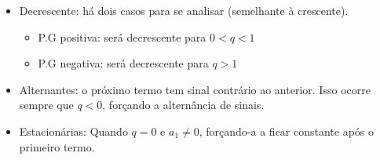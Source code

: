 \documentclass[11pt]{article}
\begin{document}
\begin{itemize}
  \item Decrescente: há dois casos para se analisar (semelhante à crescente).
        \begin{itemize}
                \item P.G positiva: será decrescente para $0 < q < 1$
                \item P.G negativa: será decrescente para $q > 1$
        \end{itemize}
\end{itemize}

\begin{itemize}
  \item Alternantes: o próximo termo tem sinal contrário ao anterior. Isso ocorre sempre que $q < 0$, forçando a alternância de sinais.

  \item Estacionárias: Quando $q = 0$ e $a_{1} \neq 0$, forçando-a a ficar constante após o primeiro termo.
\end{itemize}
\end{document}
